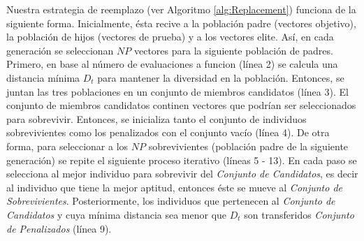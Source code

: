 Nuestra estrategia de reemplazo (ver Algoritmo \ref{alg:Replacement}) funciona de la siguiente forma.
%
Inicialmente, ésta recive a la población padre (vectores objetivo), la población de hijos (vectores de prueba) y a los vectores elite.
%
Así, en cada generación se seleccionan $NP$ vectores para la siguiente población de padres.
%
Primero, en base al número de evaluaciones a funcion (línea 2) se calcula una distancia mínima $D_t$ para mantener la diversidad en la población.
%
Entonces, se juntan las tres poblaciones en un conjunto de miembros candidatos (línea 3).
%
El conjunto de miembros candidatos continen vectores que podrían ser seleccionados para sobrevivir.
%
Entonces, se inicializa tanto el conjunto de individuos sobrevivientes como los penalizados con el conjunto vacío (línea 4).
%
De otra forma, para seleccionar a los $NP$ sobrevivientes (población padre de la siguiente generación) se repite el siguiente proceso iterativo (líneas 5 - 13).
%
En cada paso se selecciona al mejor individuo para sobrevivir del \textit{Conjunto de Candidatos}, es decir al individuo que tiene la mejor aptitud, entonces éste se mueve al \textit{Conjunto de Sobrevivientes}.
%
Posteriormente, los individuos que pertenecen al \textit{Conjunto de Candidatos} y cuya mínima distancia sea menor que $D_t$ son transferidos \textit{Conjunto de Penalizados} (línea 9).
%


